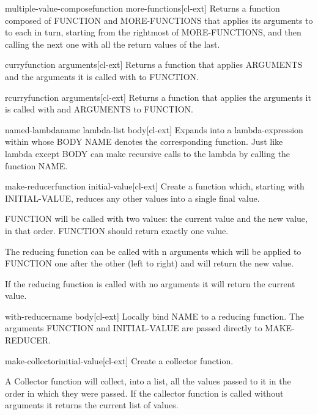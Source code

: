 \documentclass[10pt,english]{book}
\begin{document}
\begin{function}{multiple-value-compose}{function \rest more-functions}[cl-ext]
  Returns a function composed of FUNCTION and MORE-FUNCTIONS that applies
its arguments to to each in turn, starting from the rightmost of
MORE-FUNCTIONS, and then calling the next one with all the return values of
the last.
\end{function}

\begin{function}{curry}{function \rest arguments}[cl-ext]
  Returns a function that applies ARGUMENTS and the arguments
it is called with to FUNCTION.
\end{function}

\begin{function}{rcurry}{function \rest arguments}[cl-ext]
  Returns a function that applies the arguments it is called
with and ARGUMENTS to FUNCTION.
\end{function}

\begin{macro}{named-lambda}{name lambda-list \body body}[cl-ext]
  Expands into a lambda-expression within whose BODY NAME denotes the
  corresponding function. Just like lambda except BODY can make recursive
  calls to the lambda by calling the function NAME.
\end{macro}

\begin{function}{make-reducer}{function \op initial-value}[cl-ext]
  Create a function which, starting with INITIAL-VALUE, reduces
any other values into a single final value.

FUNCTION will be called with two values: the current value and
the new value, in that order. FUNCTION should return exactly one
value.

The reducing function can be called with n arguments which will
be applied to FUNCTION one after the other (left to right) and
will return the new value.

If the reducing function is called with no arguments it will
return the current value.
\end{function}

\begin{macro}{with-reducer}{name \body body}[cl-ext]
  Locally bind NAME to a reducing function. The arguments
FUNCTION and INITIAL-VALUE are passed directly to MAKE-REDUCER.
\end{macro}

\begin{function}{make-collector}{\op initial-value}[cl-ext]
  Create a collector function.

A Collector function will collect, into a list, all the values
passed to it in the order in which they were passed. If the
callector function is called without arguments it returns the
current list of values.
\end{function}
\end{document}
